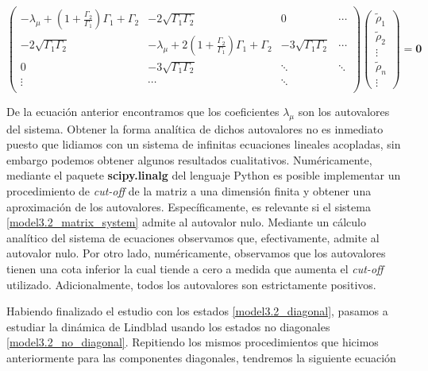 \documentclass{report} %
\numberwithin{equation}{section}
\begin{document}
\begin{equation}
    \left(\begin{array}{cccc}
       -{\lambda_\mu}+ \left(1+\frac{\Gamma_2}{\Gamma_1}\right)\Gamma_1 + \Gamma_2 & -2\sqrt{\Gamma_1 \Gamma_2} & 0 & \cdots \\
     -2\sqrt{\Gamma_1 \Gamma_2} & -{\lambda_\mu} + 2\left(1+\frac{\Gamma_2}{\Gamma_1}\right)\Gamma_1 + \Gamma_2 & -3\sqrt{\Gamma_1 \Gamma_2} &  \cdots \\ 
     0 & -3\sqrt{\Gamma_1 \Gamma_2} & \ddots & \ddots \\
        \vdots & \cdots & \ddots \\
    \end{array}\right) \left(\begin{array}{lc}
        {\tilde{\rho}}_{1}  \\
        {\tilde{\rho}}_{2}  \\
        \vdots   \\
        {\tilde{\rho}}_{n}  \\  
        \vdots
    \end{array} \right) = \mathbf{0}
    \label{model3.2_matrix_system}
\end{equation}

De la ecuación anterior encontramos que los coeficientes $\lambda_\mu$ son los autovalores del sistema. Obtener la forma analítica de dichos autovalores no es inmediato puesto que lidiamos con un sistema de infinitas ecuaciones lineales acopladas, sin embargo podemos obtener algunos resultados cualitativos. Numéricamente, mediante el paquete \textbf{scipy.linalg} del lenguaje Python es posible implementar un procedimiento de \textit{cut-off} de la matriz a una dimensión finita y obtener una aproximación de los autovalores. Específicamente, es relevante si el sistema \eqref{model3.2_matrix_system} admite al autovalor nulo. Mediante un cálculo analítico del sistema de ecuaciones observamos que, efectivamente, admite al autovalor nulo. Por otro lado, numéricamente, observamos que los autovalores tienen una cota inferior la cual tiende a cero a medida que aumenta el \textit{cut-off} utilizado. Adicionalmente, todos los autovalores son estrictamente positivos. 

Habiendo finalizado el estudio con los estados \eqref{model3.2_diagonal}, pasamos a estudiar la dinámica de Lindblad usando los estados no diagonales \eqref{model3.2_no_diagonal}. Repitiendo los mismos procedimientos que hicimos anteriormente para las componentes diagonales, tendremos la siguiente ecuación 
\end{document}
